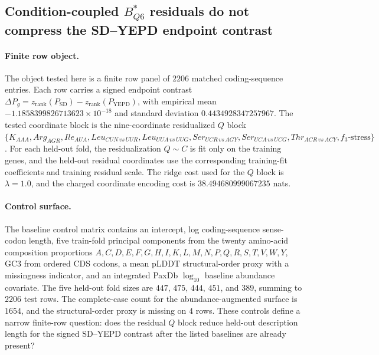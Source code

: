 
\subsection{Condition-coupled $B^*_{Q6}$ residuals do not compress the SD--YEPD endpoint contrast}
\label{sec:h3-cross-layer-relation-condition-coupled-execution-b-star-q6-sd-yepd-interaction-powered}

\paragraph{Finite row object.}
The object tested here is a finite row panel of $2206$ matched coding-sequence entries.  Each row carries a signed endpoint contrast
$\Delta P_g = z_{\mathrm{rank}}(P_{\mathrm{SD}}) - z_{\mathrm{rank}}(P_{\mathrm{YEPD}})$,
with empirical mean $-1.1858399826713623\times 10^{-18}$ and standard deviation $0.4434928347257967$.  The tested coordinate block is the nine-coordinate residualized $Q$ block
$\{K_{AAA}, Arg_{AGR}, Ile_{AUA}, Leu_{CUN\,vs\,UUR}, Leu_{UUA\,vs\,UUG}, Ser_{UCR\,vs\,AGY}, Ser_{UCA\,vs\,UCG}, Thr_{ACR\,vs\,ACY}, f_3\text{-stress}\}$.
For each held-out fold, the residualization $Q\sim C$ is fit only on the training genes, and the held-out residual coordinates use the corresponding training-fit coefficients and training residual scale.  The ridge cost used for the $Q$ block is $\lambda=1.0$, and the charged coordinate encoding cost is $38.494680999067235$ nats.

\paragraph{Control surface.}
The baseline control matrix contains an intercept, log coding-sequence sense-codon length, five train-fold principal components from the twenty amino-acid composition proportions $A,C,D,E,F,G,H,I,K,L,M,N,P,Q,R,S,T,V,W,Y$, GC3 from ordered CDS codons, a mean pLDDT structural-order proxy with a missingness indicator, and an integrated PaxDb $\log_{10}$ baseline abundance covariate.  The five held-out fold sizes are $447$, $475$, $444$, $451$, and $389$, summing to $2206$ test rows.  The complete-case count for the abundance-augmented surface is $1654$, and the structural-order proxy is missing on $4$ rows.  These controls define a narrow finite-row question: does the residual $Q$ block reduce held-out description length for the signed SD--YEPD contrast after the listed baselines are already present?

